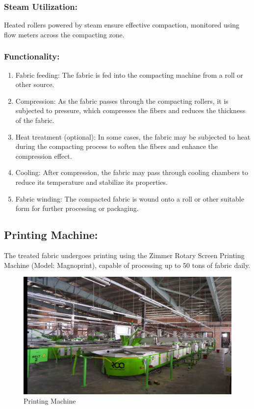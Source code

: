 \subsubsection{Steam Utilization:}
Heated rollers powered by steam ensure effective compaction, monitored using flow meters across the compacting zone.


\subsubsection{Functionality:}

\begin{enumerate}
\item
  Fabric feeding: The fabric is fed into the compacting machine from a
  roll or other source.
\item
  Compression: As the fabric passes through the compacting rollers, it
  is subjected to pressure, which compresses the fibers and reduces the
  thickness of the fabric.
\item
  Heat treatment (optional): In some cases, the fabric may be subjected
  to heat during the compacting process to soften the fibers and enhance
  the compression effect.
\item
  Cooling: After compression, the fabric may pass through cooling
  chambers to reduce its temperature and stabilize its properties.
\item
  Fabric winding: The compacted fabric is wound onto a roll or other
  suitable form for further processing or packaging.
\end{enumerate}


\subsection{Printing Machine:} 
The treated fabric undergoes printing using the Zimmer Rotary Screen Printing Machine (Model: Magnoprint), capable of processing up to 50 tons of fabric daily.

\begin{figure}[h!]
  \centering
  \includegraphics[width=0.8\linewidth]{figs/placement_printing.jpg}
  \caption{Printing Machine}
  \label{fig:Printing Machine}
\end{figure}

